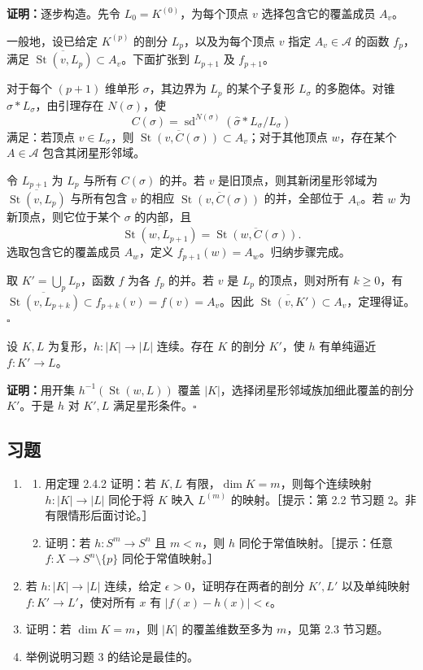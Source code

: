 \noindent\textbf{证明：}逐步构造。先令 $L_0=K^{(0)}$，为每个顶点 $v$ 选择包含它的覆盖成员 $A_v$。

一般地，设已给定 $K^{(p)}$ 的剖分 $L_p$，以及为每个顶点 $v$ 指定 $A_v\in\mathcal A$ 的函数 $f_p$，满足 $\overline{\operatorname{St}(v,L_p)}\subset A_v$。下面扩张到 $L_{p+1}$ 及 $f_{p+1}$。

对于每个 $(p+1)$ 维单形 $\sigma$，其边界为 $L_p$ 的某个子复形 $L_\sigma$ 的多胞体。对锥 $\widehat\sigma*L_\sigma$，由引理存在 $N(\sigma)$，使
\[
C(\sigma)=\operatorname{sd}^{N(\sigma)}(\widehat\sigma*L_\sigma/L_\sigma)
\]
满足：若顶点 $v\in L_\sigma$，则 $\overline{\operatorname{St}(v,C(\sigma))}\subset A_v$；对于其他顶点 $w$，存在某个 $A\in\mathcal A$ 包含其闭星形邻域。

令 $L_{p+1}$ 为 $L_p$ 与所有 $C(\sigma)$ 的并。若 $v$ 是旧顶点，则其新闭星形邻域为 $\overline{\operatorname{St}(v,L_p)}$ 与所有包含 $v$ 的相应 $\overline{\operatorname{St}(v,C(\sigma))}$ 的并，全部位于 $A_v$。若 $w$ 为新顶点，则它位于某个 $\sigma$ 的内部，且
\[
\overline{\operatorname{St}(w,L_{p+1})}
=\overline{\operatorname{St}(w,C(\sigma))}.
\]
选取包含它的覆盖成员 $A_w$，定义 $f_{p+1}(w)=A_w$。归纳步骤完成。

取 $K'=\bigcup_p L_p$，函数 $f$ 为各 $f_p$ 的并。若 $v$ 是 $L_p$ 的顶点，则对所有 $k\geq0$，有 $\overline{\operatorname{St}(v,L_{p+k})}\subset f_{p+k}(v)=f(v)=A_v$。因此 $\overline{\operatorname{St}(v,K')}\subset A_v$，定理得证。\hfill$\square$

设 $K,L$ 为复形，$h:|K|\to|L|$ 连续。存在 $K$ 的剖分 $K'$，使 $h$ 有单纯逼近 $f:K'\to L$。

\noindent\textbf{证明：}用开集 $h^{-1}(\operatorname{St}(w,L))$ 覆盖 $|K|$，选择闭星形邻域族加细此覆盖的剖分 $K'$。于是 $h$ 对 $K',L$ 满足星形条件。\hfill$\square$

\subsection*{习题}
\begin{enumerate}
\item \begin{enumerate}[label=(\alph*)]
\item 用定理 2.4.2 证明：若 $K,L$ 有限，$\dim K=m$，则每个连续映射 $h:|K|\to|L|$ 同伦于将 $K$ 映入 $L^{(m)}$ 的映射。［提示：第 2.2 节习题 2。非有限情形后面讨论。］
\item 证明：若 $h:S^m\to S^n$ 且 $m<n$，则 $h$ 同伦于常值映射。［提示：任意 $f:X\to S^n\setminus\{p\}$ 同伦于常值映射。］
\end{enumerate}
\item 若 $h:|K|\to|L|$ 连续，给定 $\epsilon>0$，证明存在两者的剖分 $K',L'$ 以及单纯映射 $f:K'\to L'$，使对所有 $x$ 有 $|f(x)-h(x)|<\epsilon$。
\item 证明：若 $\dim K=m$，则 $|K|$ 的覆盖维数至多为 $m$，见第 2.3 节习题。
\item 举例说明习题 3 的结论是最佳的。
\end{enumerate}
